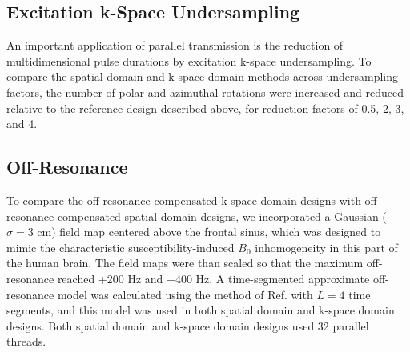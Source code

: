 \subsection*{Excitation k-Space Undersampling}
An important application of parallel transmission is the reduction of multidimensional pulse durations by excitation k-space undersampling.
To compare the spatial domain and k-space domain methods across undersampling factors,
the number of polar and azimuthal rotations were increased and reduced relative to the reference design described above, 
for reduction factors of 0.5, 2, 3, and 4. 

\subsection*{Off-Resonance}
To compare the off-resonance-compensated k-space domain designs with off-resonance-compensated spatial domain designs,
we incorporated a Gaussian ($\sigma = 3$ cm) field map centered above the frontal sinus, 
which was designed to mimic the characteristic susceptibility-induced $B_0$ inhomogeneity in this part of the human brain. 
The field maps were than scaled so that the maximum off-resonance reached +200 Hz and +400 Hz.
A time-segmented approximate off-resonance model was calculated using the method of Ref. \cite{fessler2005toeplitz} with $L = 4$ time segments,
and this model was used in both spatial domain and k-space domain designs. 
Both spatial domain and k-space domain designs used 32 parallel threads. 


